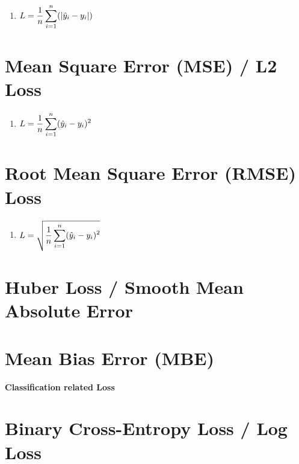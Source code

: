 \begin{enumerate}
    \item[] 
    $
        L = \dfrac{1}{n} \displaystyle\sum_{i=1}^n (\left| \hat{y}_i - y_i \right|)
    $
    \hfill \cite{medium.com/analytics-vidhya/common-loss-functions-in-machine-learning-for-a-regression-model-27d2bbda9c93}
\end{enumerate}

\section{Mean Square Error (MSE) / L2 Loss}

\begin{enumerate}
    \item[] 
    $
        L = \dfrac{1}{n} \displaystyle\sum_{i=1}^n (\hat{y}_i - y_i)^2
    $
    \hfill \cite{medium.com/analytics-vidhya/common-loss-functions-in-machine-learning-for-a-regression-model-27d2bbda9c93}
\end{enumerate}

\section{Root Mean Square Error (RMSE) Loss}

\begin{enumerate}
    \item[] 
    $
        L = \sqrt{\dfrac{1}{n} \displaystyle\sum_{i=1}^n (\hat{y}_i - y_i)^2}
    $
    \hfill \cite{medium.com/analytics-vidhya/common-loss-functions-in-machine-learning-for-a-regression-model-27d2bbda9c93}
\end{enumerate}

\section{Huber Loss / Smooth Mean Absolute Error}


\section{Mean Bias Error (MBE)}



\clearpage
{\centering\fontsize{22}{22}\selectfont\bfseries Classification related Loss \par}
\vspace{0.5cm}


\section{Binary Cross-Entropy Loss / Log Loss}

